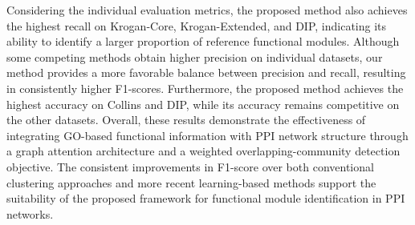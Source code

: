 Considering the individual evaluation metrics, the proposed method also achieves the highest recall on Krogan-Core, Krogan-Extended, and DIP, indicating its ability to identify a larger proportion of reference functional modules. Although some competing methods obtain higher precision on individual datasets, our method provides a more favorable balance between precision and recall, resulting in consistently higher F1-scores. Furthermore, the proposed method achieves the highest accuracy on Collins and DIP, while its accuracy remains competitive on the other datasets. Overall, these results demonstrate the effectiveness of integrating GO-based functional information with PPI network structure through a graph attention architecture and a weighted overlapping-community detection objective. The consistent improvements in F1-score over both conventional clustering approaches and more recent learning-based methods support the suitability of the proposed framework for functional module identification in PPI networks.



